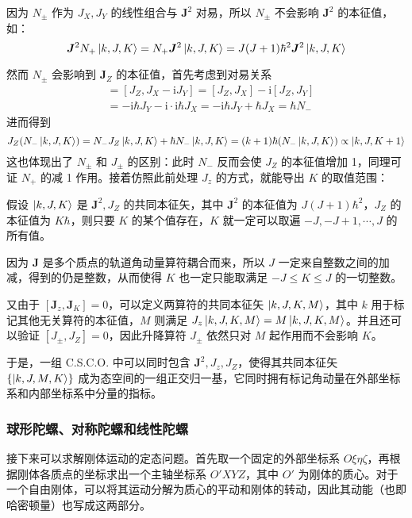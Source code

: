 \documentclass[cn,10pt,math=newtx,citestyle=gb7714-2015,bibstyle=gb7714-2015]{elegantbook}
\def\bm{\boldsymbol}
\def\i{\mathrm i}
\begin{document}
因为 $N_\pm$ 作为 $J_X,J_Y$ 的线性组合与 $\bm J^2$ 对易，所以 $N_\pm$ 不会影响 $\bm J^2$ 的本征值，如：
\begin{equation}
    \bm J^2 N_+\ket{k,J,K} = N_+\bm J^2\ket{k,J,K} = J(J+1)\hbar^2\bm J^2\ket{k,J,K}
\end{equation}

然而 $N_\pm$ 会影响到 $\bm J_Z$ 的本征值，首先考虑到对易关系
\begin{align}
    [J_Z,N_-] & = [J_Z,J_X-\i J_Y] = [J_Z,J_X] - \i[J_Z,J_Y]\nonumber\\
    & = -\i\hbar J_Y-\i\cdot\i\hbar J_X = -\i\hbar J_Y+\hbar J_X = \hbar N_-
\end{align}
进而得到
\begin{equation}
    J_Z(N_-\ket{k,J,K}) = N_-J_Z\ket{k,J,K}+\hbar N_-\ket{k,J,K} = (k+1)\hbar(N_-\ket{k,J,K})\propto \ket{k,J,K+1}
\end{equation}
这也体现出了 $N_\pm$ 和 $J_\pm$ 的区别：此时 $N_-$ 反而会使 $J_Z$ 的本征值增加 1，同理可证 $N_+$ 的减 1 作用。接着仿照此前处理 $J_z$ 的方式，就能导出 $K$ 的取值范围：
\begin{theorem}[$J_Z$ 的本征值]
   假设 $\ket{k,J,K}$ 是 $\bm J^2,J_Z$ 的共同本征矢，其中 $\bm J^2$ 的本征值为 $J(J+1)\hbar^2$，$J_Z$ 的本征值为 $K\hbar$，则只要 $K$ 的某个值存在，$K$ 就一定可以取遍 $-J,-J+1,\cdots,J$ 的所有值。
\end{theorem}
因为 $\bm J$ 是多个质点的轨道角动量算符耦合而来，所以 $J$ 一定来自整数之间的加减，得到的仍是整数，从而使得 $K$ 也一定只能取满足 $-J\le K\le J$ 的一切整数。

又由于 $[\bm J_z,\bm J_K]=0$，可以定义两算符的共同本征矢 $\ket{k,J,K,M}$，其中 $k$ 用于标记其他无关算符的本征值，$M$ 则满足 $J_z\ket{k,J,K,M} = M\ket{k,J,K,M}$。并且还可以验证 $[J_\pm,J_Z]=0$，因此升降算符 $J_\pm$ 依然只对 $M$ 起作用而不会影响 $K$。

于是，一组 C.S.C.O. 中可以同时包含 $\bm J^2,J_z,J_Z$，使得其共同本征矢 $\{\ket{k,J,M,K}\}$ 成为态空间的一组正交归一基，它同时拥有标记角动量在外部坐标系和内部坐标系中分量的指标。

\subsubsection{球形陀螺、对称陀螺和线性陀螺}
接下来可以求解刚体运动的定态问题。首先取一个固定的外部坐标系 $O\xi\eta\zeta$，再根据刚体各质点的坐标求出一个主轴坐标系 $O'XYZ$，其中 $O'$ 为刚体的质心。对于一个自由刚体，可以将其运动分解为质心的平动和刚体的转动，因此其动能（也即哈密顿量）也写成这两部分。
\end{document}
